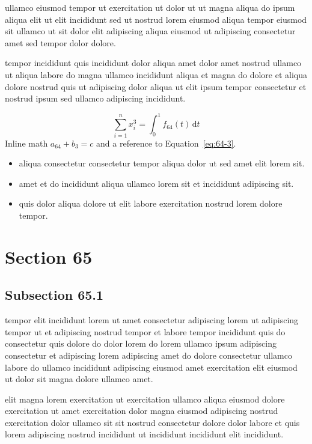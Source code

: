 \documentclass{article}
\begin{document}
ullamco eiusmod tempor ut exercitation ut dolor ut ut magna aliqua do ipsum aliqua elit ut elit incididunt sed ut nostrud lorem eiusmod aliqua tempor eiusmod sit ullamco ut sit dolor elit adipiscing aliqua eiusmod ut adipiscing consectetur amet sed tempor dolor dolore.

tempor incididunt quis incididunt dolor aliqua amet dolor amet nostrud ullamco ut aliqua labore do magna ullamco incididunt aliqua et magna do dolore et aliqua dolore nostrud quis ut adipiscing dolor aliqua ut elit ipsum tempor consectetur et nostrud ipsum sed ullamco adipiscing incididunt.

\begin{equation}\label{eq:64-3}
  \sum_{i=1}^{n} x_i^{3} = \int_0^1 f_{64}(t)\,\mathrm{d}t
\end{equation}
Inline math $a_{64} + b_{3} = c$ and a reference to Equation~\eqref{eq:64-3}.

\begin{itemize}
  \item aliqua consectetur consectetur tempor aliqua dolor ut sed amet elit lorem sit.
  \item amet et do incididunt aliqua ullamco lorem sit et incididunt adipiscing sit.
  \item quis dolor aliqua dolore ut elit labore exercitation nostrud lorem dolore tempor.
\end{itemize}

\section{Section 65}\label{sec:65}
\subsection{Subsection 65.1}\label{sec:65-1}
tempor elit incididunt lorem ut amet consectetur adipiscing lorem ut adipiscing tempor ut et adipiscing nostrud tempor et labore tempor incididunt quis do consectetur quis dolore do dolor lorem do lorem ullamco ipsum adipiscing consectetur et adipiscing lorem adipiscing amet do dolore consectetur ullamco labore do ullamco incididunt adipiscing eiusmod amet exercitation elit eiusmod ut dolor sit magna dolore ullamco amet.

elit magna lorem exercitation ut exercitation ullamco aliqua eiusmod dolore exercitation ut amet exercitation dolor magna eiusmod adipiscing nostrud exercitation dolor ullamco sit sit nostrud consectetur dolore dolor labore et quis lorem adipiscing nostrud incididunt ut incididunt incididunt elit incididunt.
\end{document}
